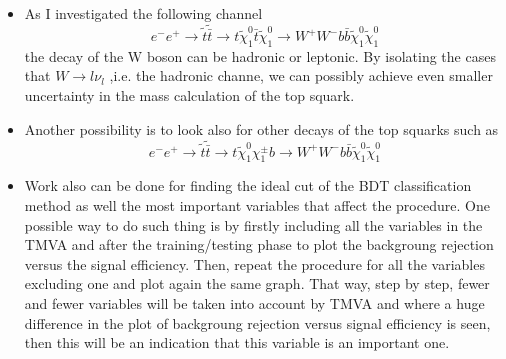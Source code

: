 \documentclass[12pt,a4paper]{report}
\begin{document}
\begin{itemize}
 \item As I investigated the following channel
    \begin{equation}
      e^{-} e^{+} \rightarrow \tilde{t} \tilde{\bar{t}} \rightarrow t\tilde{\chi}_{1}^{0} \bar{t}\tilde{\chi}_{1}^{0}
      \rightarrow W^{+}W^{-}b\bar{b} \tilde{\chi}_{1}^{0} \tilde{\chi}_{1}^{0}
    \end{equation}
the decay of the W boson can be hadronic or leptonic. By isolating the cases that $W\rightarrow l\nu_{l}$
,i.e. the hadronic channe, we can possibly achieve even smaller uncertainty in the mass calculation of the top
squark.
\item Another possibility is to look also for other decays of the top squarks such as 
    \begin{equation}
      e^{-}e^{+} \rightarrow \tilde{t}\tilde{\bar{t}} \rightarrow t \tilde{\chi}_{1}^{0}
      \chi^{\pm}_{1}b \rightarrow
      W^{+}W^{-} b \bar{b} \tilde{\chi}_{1}^{0}  \tilde{\chi}_{1}^{0}
    \end{equation}

\item Work also can be done for finding the ideal cut of the BDT classification method as well the most 
important variables that affect the procedure. One possible way to do such thing is by firstly including
all the variables in the TMVA and after the training/testing phase to plot the backgroung rejection versus 
the signal efficiency. Then, repeat the procedure for all the variables excluding one and plot again the same 
graph. That way, step by step, fewer and fewer variables will be taken into account by TMVA and where a huge 
difference in the plot of backgroung rejection versus signal efficiency is seen, then this will be an 
indication that this variable is an important one.

\end{itemize}


\newpage



\end{document}
